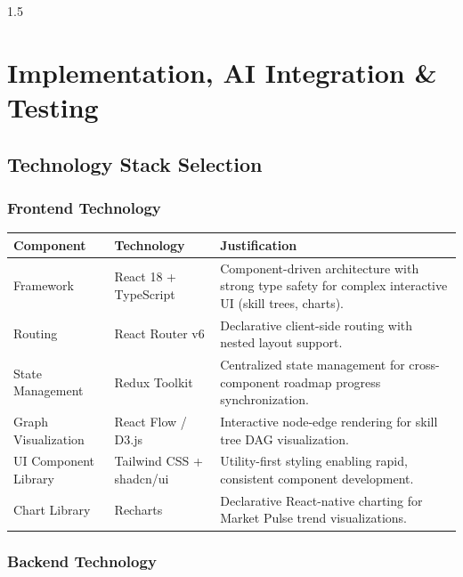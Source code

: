 \documentclass[12pt,a4paper]{report}
\begin{document}
\begin{spacing}{1.5}
		\chapter{Implementation, AI Integration \& Testing}
		
		\section{Technology Stack Selection}
		
		\subsection{Frontend Technology}
		
		\begin{longtable}{|p{3cm}|p{4cm}|p{8cm}|}
			\hline
			\rowcolor{gray!20}\textbf{Component} & \textbf{Technology} & \textbf{Justification} \\ \hline
			Framework & React 18 + TypeScript & Component-driven architecture with strong type safety for complex interactive UI (skill trees, charts). \\ \hline
			Routing & React Router v6 & Declarative client-side routing with nested layout support. \\ \hline
			State Management & Redux Toolkit & Centralized state management for cross-component roadmap progress synchronization. \\ \hline
			Graph Visualization & React Flow / D3.js & Interactive node-edge rendering for skill tree DAG visualization. \\ \hline
			UI Component Library & Tailwind CSS + shadcn/ui & Utility-first styling enabling rapid, consistent component development. \\ \hline
			Chart Library & Recharts & Declarative React-native charting for Market Pulse trend visualizations. \\ \hline
		\end{longtable}
		
		\subsection{Backend Technology}
		

\end{spacing}
\end{document}
